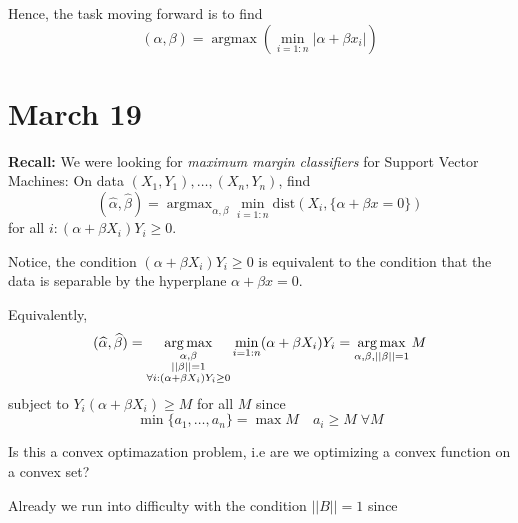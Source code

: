 \documentclass[12pt]{report}
\renewcommand{\hat}[1]{\widehat{#1}}
\newcommand{\abs}[1]{\left\vert #1 \right\vert}
\newcommand{\norm}[1]{\left\vert\left\vert #1 \right\vert\right\vert}
\newcommand*{\tbf}[1]{\ifmmode\mathbf{#1}\else\textbf{#1}\fi}
\DeclareMathOperator*{\argmax}{\arg\max}
\begin{document}
Hence, the task moving forward is to find
\[(\alpha, \beta) = \argmax \left(\min_{i=1:n} \abs{\alpha + \beta x_i}\right) \]

\section{March 19}
\tbf{Recall:} We were looking for \emph{maximum margin classifiers} for Support Vector Machines: On data $(X_1, Y_1), \dots, (X_n, Y_n)$, find
\[(\hat \alpha, \hat \beta) = \argmax_{\alpha, \beta} \min_{i=1:n} \text{dist}(X_i, \{\alpha + \beta x =0 \})\]
for all $i: (\alpha + \beta X_i) Y_i \geq 0$.

Notice, the condition $(\alpha + \beta X_i) Y_i \geq 0$ is equivalent to the condition that the data is separable by the hyperplane $\alpha + \beta x = 0$.

Equivalently,
\[(\hat \alpha, \hat \beta) = \argmax_{\begin{subarray}{c}
            \alpha, \beta \\
            \norm{\beta} = 1\\
            \forall i: (\alpha + \beta X_i) Y_i \geq 0
        \end{subarray}} \min_{i=1:n} (\alpha + \beta X_i) Y_i = \argmax_{\alpha, \beta, \norm{\beta}=1} M\]
subject to $Y_i(\alpha + \beta X_i) \geq M$ for all $M$ since
\[\min \{a_1, \dots, a_n\} = \max M \quad a_i \geq M\; \forall M\]

Is this a convex optimazation problem, i.e are we optimizing a convex function on a convex set?

Already we run into difficulty with the condition $\norm B = 1$ since

\begin{center}
    \hspace{1cm}
\end{center}
\end{document}
